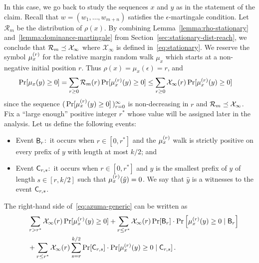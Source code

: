 In this case, we go back to study the sequences $x$ and $y$ as in the statement of the claim.
Recall that $w = (w_1, \ldots, w_{m+n})$ satisfies the $\epsilon$-martingale condition. 
Let $\mathcal{R}_m$ be the distribution of $\rho(x)$.
By combining Lemma~\ref{lemma:rho-stationary} and~\ref{lemma:dominance-martingale} from Section~\ref{sec:stationary-dist-reach}, 
we conclude that $\mathcal{R}_m \preceq \mathcal{X}_\infty$ 
where $\mathcal{X}_\infty$ is defined in~\eqref{eq:stationary}.
We reserve the symbol $\mu_x^{(r)}$ for the relative margin 
random walk $\mu_x$ which starts at a non-negative initial position $r$. 
Thus $\rho(x) = \mu_x(\epsilon) = r$, and
\begin{align}\label{eq:azuma-generic}
\Pr[\mu_x(y) \geq 0] 
&= \sum_{r \geq 0}{\mathcal{R}_m(r) \Pr[\mu_x^{(r)}(y) \geq 0]} 
\leq \sum_{r \geq 0}{\mathcal{X}_\infty(r) \Pr[\mu_x^{(r)}(y) \geq 0]} 
\, 
\end{align}
since the sequence $( \, \Pr[\mu_x^{(r)}(y) \geq 0] \, )_{r=0}^\infty$ is non-decreasing in $r$ 
and $\mathcal{R}_m \preceq \mathcal{X}_\infty$. 
Fix a ``large enough'' positive integer $r^*$ whose value will be assigned later in the analysis. 
Let us define the following events:
 \begin{itemize}
  \item Event $\mathsf{B}_r$:~it occurs when $r \in [0, r^*]$ and the $\mu_x^{(r)}$ walk is strictly positive on every prefix of $y$ with length at most $k/2$; and 
  \item Event $\mathsf{C}_{r,s}$:~it occurs when $r \in [0, r^*]$ and 
  $\hat{y}$ is the smallest prefix of $y$ of length $s \in [r, k/2]$ 
  such that $\mu_x^{(r)}(\hat{y}) = 0$. 
  We say that $\hat{y}$ is a witnesses to the event $\mathsf{C}_{r, s}$.
\end{itemize}
The right-hand side of~\eqref{eq:azuma-generic} can be written as
\begin{align*}
     &\quad \sum_{r>r^*}{\mathcal{X}_\infty(r) \Pr[\mu_x^{(r)}(y) \geq 0]} 
		+ \sum_{r \leq r^*}{\mathcal{X}_\infty(r) \Pr[\mathsf{B}_r] \cdot \Pr\left[\mu_x^{(r)}(y) \geq 0 \mid \mathsf{B}_r\right]} \\
    &\quad+ \sum_{r \leq r^*}{\mathcal{X}_\infty(r) \sum_{s = r}^{k/2}{\Pr[\mathsf{C}_{r,s}] \cdot \Pr[\mu_x^{(r)}(y) \geq 0 \mid \mathsf{C}_{r,s}]} }
    \, .
\end{align*} 

